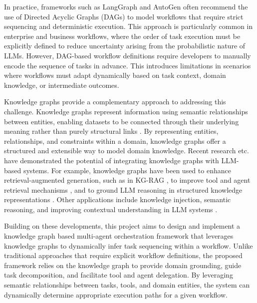 \noindent In practice, frameworks such as LangGraph and AutoGen often recommend the use of Directed Acyclic Graphs (DAGs) to model workflows that require strict sequencing and deterministic execution. This approach is particularly common in enterprise and business workflows, where the order of task execution must be explicitly defined to reduce uncertainty arising from the probabilistic nature of LLMs. 
However, DAG-based workflow definitions require developers to manually encode the sequence of tasks in advance. This introduces limitations in scenarios where workflows must adapt dynamically based on task context, domain knowledge, or intermediate outcomes.

\noindent Knowledge graphs provide a complementary approach to addressing this challenge. Knowledge graphs represent information using semantic relationships between entities, enabling datasets to be connected through their underlying meaning rather than purely structural links \citet{Hogan_2021}. By representing entities, relationships, and constraints within a domain, knowledge graphs offer a structured and extensible way to model domain knowledge. Recent research \citet{nizar2025agentasagraphknowledgegraphbasedtool, sanmartin2024kgragbridginggapknowledge, kau2024combiningknowledgegraphslarge, } etc. have demonstrated the potential of integrating knowledge graphs with LLM-based systems. For example, knowledge graphs have been used to enhance retrieval-augmented generation, such as in KG-RAG \citep{sanmartin2024kgragbridginggapknowledge}, to improve tool and agent retrieval mechanisms \citep{nizar2025agentasagraphknowledgegraphbasedtool}, and to ground LLM reasoning in structured knowledge representations \citep{amayuelas2025groundingllmreasoningknowledge}. 
Other applications include knowledge injection, semantic reasoning, and improving contextual understanding in LLM systems \citep{kau2024combiningknowledgegraphslarge}.

\noindent Building on these developments, this project aims to design and implement a knowledge graph based multi-agent orchestration framework that leverages knowledge graphs to dynamically infer task sequencing within a workflow. Unlike traditional approaches that require explicit workflow definitions, the proposed framework relies on the knowledge graph to provide domain grounding, guide task decomposition, and facilitate tool and agent delegation. By leveraging semantic relationships between tasks, tools, and domain entities, the system can dynamically determine appropriate execution paths for a given workflow.

